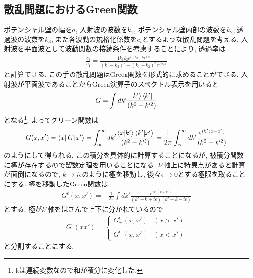 \documentclass[10.5pt,a4paper]{jreport}
\begin{document}
\subsection{散乱問題におけるGreen関数}
ポテンシャル壁の幅を$a$, 入射波の波数を$k_1$, ポテンシャル壁内部の波数を$k_2$, 透過波の波数を$k_3$, また各波動の規格化係数を$c_i$とするような散乱問題を考える. 入射波を平面波として波動関数の接続条件を考慮することにより, 透過率は
\begin{eqnarray}
  \frac{c_3}{c_1} = \frac{4k_1k_2e^{i(k_2-k_1)a}}{(k_1 - k_2)^2 - (k_1 - k_2)^2e^{2ik_2a}}
\end{eqnarray}
と計算できる. この手の散乱問題はGreen関数を形式的に求めることができる. 入射波が平面波であることからGreen演算子のスペクトル表示を用いると
\begin{eqnarray}
  G = \int dk' \frac{\ket{k'}\bra{k'}}{(k^2-k'^2)}
\end{eqnarray}
となる\footnote{kは連続変数なので和が積分に変化した.}. よってグリーン関数は
\begin{eqnarray}
  G(x, x') = \bra{x}G\ket{x'} = \int_\infty^\infty dk' \frac{\expval{x|k'}\expval{k'|x'}}{(k^2-k'^2)} = \frac{1}{2\pi}\int_\infty^\infty dk' \frac{e^{ik'(x-x')}}{(k^2-k'^2)}
\end{eqnarray}
のようにして得られる. この積分を具体的に計算することになるが, 被積分関数に極が存在するので留数定理を用いることになる. $k'$軸上に特異点があると計算が面倒になるので, $k\rightarrow i\epsilon$のように極を移動し, 後々$\epsilon\rightarrow 0$とする極限を取ることにする. 極を移動したGreen関数は
\begin{eqnarray}
  G^\epsilon(x, x') = -\frac{1}{2\pi}\int dk'\frac{e^{ik'(x-x')}}{(k'+k+i\epsilon)(k'-k-i\epsilon)}
\end{eqnarray}
とする. 極が$k'$軸をはさんで上下に分かれているので
\begin{eqnarray}
  G^\epsilon(x x') =
  \begin{cases}
    G^\epsilon_+(x, x')&(x > x')\\
    \\
    G^\epsilon_-(x, x')&(x < x')
  \end{cases}
\end{eqnarray}
と分割することにする.
\newpage
\end{document}
